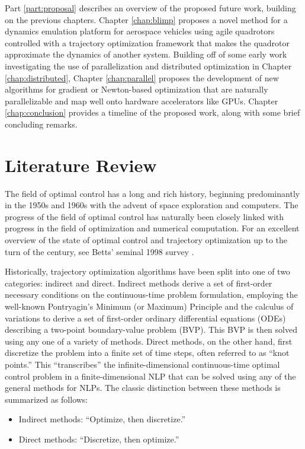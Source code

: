 \documentclass[../root.tex]{subfiles}
\begin{document}
Part \ref{part:proposal} describes an overview of the proposed future work,
building on the previous chapters. Chapter \ref{chap:blimp} proposes a novel
method for a dynamics emulation platform for aerospace vehicles using agile
quadrotors controlled with a trajectory optimization framework that makes the
quadrotor approximate the dynamics of another system. Building off of some
early work investigating the use of parallelization and distributed
optimization in Chapter \ref{chap:distributed}, Chapter \ref{chap:parallel}
proposes the development of new algorithms for gradient or Newton-based
optimization that are naturally parallelizable and map well onto hardware
accelerators like GPUs. Chapter \ref{chap:conclusion} provides a timeline of
the proposed work, along with some brief concluding remarks.

\section{Literature Review} \label{sec:lit_review}
The field of optimal control has a long and rich history, beginning predominantly in the 
1950s and 1960s with the advent of space exploration and computers. The progress of the field of 
optimal control has naturally been closely linked with progress in the field of optimization 
and numerical computation. For an excellent overview of the state of optimal control
and trajectory optimization up to the turn of the century, see Betts' seminal 1998 survey 
\cite{betts_Survey_1998}. 

Historically, trajectory optimization algorithms have been split into one of two categories:
indirect and direct. Indirect methods derive a set of first-order necessary conditions on the 
continuous-time problem formulation, employing the well-known Pontryagin's Minimum (or Maximum)
Principle and the calculus of variations to derive a set of first-order ordinary differential 
equations (ODEs) describing a two-point boundary-value problem (BVP). This BVP is then solved
using any one of a variety of methods. Direct methods, on the other hand, first discretize the 
problem into a finite set of time steps, often referred to as ``knot points.'' This ``transcribes''
the infinite-dimensional continuous-time optimal control problem in a finite-dimensional NLP that
can be solved using any of the general methods for NLPs. The classic distinction between these 
methods is summarized as follows:
\begin{itemize}
	\item Indirect methods: ``Optimize, then discretize.''
	\item Direct methods: ``Discretize, then optimize.''
\end{itemize}
\end{document}
